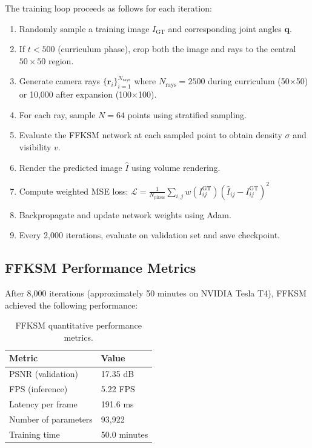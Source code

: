 \documentclass[12pt,a4paper,oneside]{report}
\begin{document}
The training loop proceeds as follows for each iteration:
\begin{enumerate}
    \item Randomly sample a training image $I_{\text{GT}}$ and corresponding joint angles $\mathbf{q}$.
    \item If $t < 500$ (curriculum phase), crop both the image and rays to the central $50 \times 50$ region.
    \item Generate camera rays $\{\mathbf{r}_i\}_{i=1}^{N_{\text{rays}}}$ where $N_{\text{rays}} = 2500$ during curriculum (50$\times$50) or 10,000 after expansion (100$\times$100).
    \item For each ray, sample $N=64$ points using stratified sampling.
    \item Evaluate the FFKSM network at each sampled point to obtain density $\sigma$ and visibility $v$.
    \item Render the predicted image $\hat{I}$ using volume rendering.
    \item Compute weighted MSE loss: $\mathcal{L} = \frac{1}{N_{\text{pixels}}} \sum_{i,j} w(I_{ij}^{\text{GT}}) (\hat{I}_{ij} - I_{ij}^{\text{GT}})^2$
    \item Backpropagate and update network weights using Adam.
    \item Every 2,000 iterations, evaluate on validation set and save checkpoint.
\end{enumerate}

\subsection{FFKSM Performance Metrics}

After 8,000 iterations (approximately 50 minutes on NVIDIA Tesla T4), FFKSM achieved the following performance:

\begin{table}[H]
\centering
\caption{FFKSM quantitative performance metrics.}
\label{tab:ffksm_performance}
\begin{tabular}{ll}
\toprule
\textbf{Metric} & \textbf{Value} \\
\midrule
PSNR (validation) & 17.35 dB \\
FPS (inference) & 5.22 FPS \\
Latency per frame & 191.6 ms \\
Number of parameters & 93,922 \\
Training time & 50.0 minutes \\
\bottomrule
\end{tabular}
\end{table}
\end{document}
